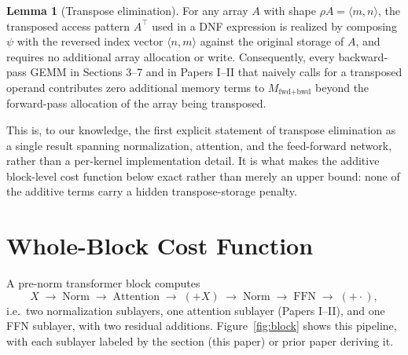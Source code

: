 \documentclass[11pt]{article}
\newcommand{\psii}{\psi}
\theoremstyle{definition}
\newtheorem{lemma}{Lemma}
\begin{document}
\begin{lemma}[Transpose elimination]
For any array $A$ with shape $\rho A = \langle m,n\rangle$, the
transposed access pattern $A^{\top}$ used in a DNF expression is
realized by composing $\psii$ with the reversed index vector $\langle
n,m\rangle$ against the original storage of $A$, and requires no
additional array allocation or write. Consequently, every backward-pass
GEMM in Sections 3--7 and in Papers I--II that naively calls for a
transposed operand contributes zero additional memory terms to
$M_{\text{fwd+bwd}}$ beyond the forward-pass allocation of the array
being transposed.
\end{lemma}

This is, to our knowledge, the first explicit statement of transpose
elimination as a single result spanning normalization, attention, and
the feed-forward network, rather than a per-kernel implementation
detail. It is what makes the additive block-level cost function below
exact rather than merely an upper bound: none of the additive terms
carry a hidden transpose-storage penalty.

\section{Whole-Block Cost Function}

A pre-norm transformer block computes
\[
X \;\to\; \mathrm{Norm} \;\to\; \mathrm{Attention} \;\to\; (+X) \;\to\;
\mathrm{Norm} \;\to\; \mathrm{FFN} \;\to\; (+\cdot),
\]
i.e.\ two normalization sublayers, one attention sublayer (Papers
I--II), and one FFN sublayer, with two residual additions.
Figure~\ref{fig:block} shows this pipeline, with each sublayer labeled
by the section (this paper) or prior paper deriving it.
\end{document}
